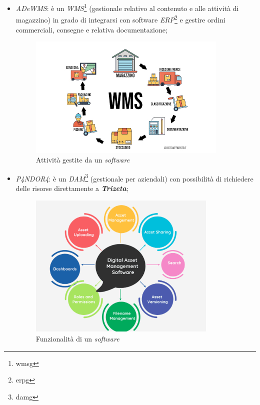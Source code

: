 \begin{itemize}
    \item \textit{ADeWMS}: è un \textit{WMS}\footnote{\gls{wmsg}} (gestionale relativo al contenuto e alle attività di magazzino) in grado di integrarsi con software \textit{ERP}\footnote{\gls{erpg}} e gestire ordini commerciali, consegne e relativa documentazione;
    \begin{figure}[H]
        \centering
        \includegraphics[width=0.9\textwidth]{images/wms.jpg}
        \caption[Funzionalità di un \textit{software WMS}]{Attività gestite da un \textit{software } \footnotemark}
    \end{figure}
    {}
    
    \item \textit{P4NDOR4}: è un \textit{DAM}\footnote{\gls{damg}} (gestionale per  aziendali) con possibilità di richiedere delle risorse direttamente a \textit{\textbf{Trizeta}};
    \begin{figure}[H]
        \centering
        \includegraphics[width=0.85\textwidth]{images/dam.png}
        \caption[Funzionalità di un \textit{software DAM}]{Funzionalità di un \textit{software } \footnotemark}
    \end{figure}
    {}


\end{itemize}
